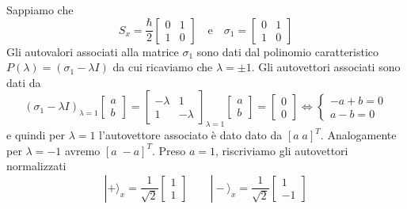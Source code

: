 \noindent Sappiamo che 
\begin{equation*}
	S_x = \frac{\hbar}{2} \left [ \begin{array}{cc}
		0 & 1 \\ 
		1 & 0 
	\end{array} \right ]  \quad \text{e} \quad \sigma_1 = \left [ \begin{array}{cc}
		0 & 1 \\ 
		1 & 0 
	\end{array} \right ]
\end{equation*}
Gli autovalori associati alla matrice $\sigma_1$ sono dati dal  polinomio caratteristico $P(\lambda) = (\sigma_1 - \lambda I)$ da cui ricaviamo che $\lambda = \pm 1$. Gli autovettori associati sono dati da 
\begin{equation*}
 (\sigma_1 - \lambda I)_{\lambda = 1} \left [\begin{array}{c}
 	a \\ b
 \end{array} \right ] = \left [\begin{array}{cc}
 	- \lambda & 1 \\
 	1 & - \lambda 
 \end{array} \right ]_{\lambda = 1 } \left [\begin{array}{c}
 	a \\ b
 \end{array} \right ]  = \left [\begin{array}{c}
 	0 \\ 0
 \end{array} \right ]  \iff \left \{ \begin{array}{l}
 	-a + b = 0 \\ 
 	a  - b = 0
 \end{array}\right.
\end{equation*}
e quindi per $\lambda = 1$ l'autovettore associato \`e dato dato da $[a \; a]^T$. Analogamente per $\lambda = -1$ avremo $[a \; -a]^{T}$. Preso $a = 1$, riscriviamo gli autovettori normalizzati
\begin{equation*}
	| + \rangle_{x} = \frac{1}{\sqrt{2}} \left [\begin{array}{l}
		1 \\
1	\end{array}\right ]  \quad \quad |-\rangle_{x} = \frac{1}{\sqrt{2}} \left [\begin{array}{c}
		1 \\ -1	\end{array}\right ] 
\end{equation*}
